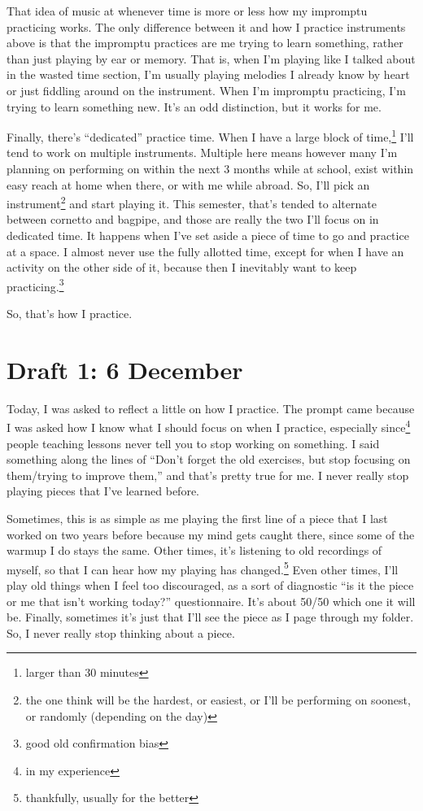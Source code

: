 \documentclass[12pt]{article}[titlepage]
\newcommand{\say}[1]{``#1''}
\newcommand{\1}{\={a}}
\newcommand{\2}{\={e}}
\newcommand{\3}{\={\i}}
\newcommand{\4}{\=o}
\newcommand{\5}{\=u}
\newcommand{\6}{\={A}}
\renewcommand{\,}{\textsuperscript{,}}
\begin{document}
That idea of music at whenever time is more or less how my impromptu practicing works.
The only difference between it and how I practice instruments above is that the impromptu practices are me trying to learn something, rather than just playing by ear or memory.
That is, when I'm playing like I talked about in the wasted time section, I'm usually playing melodies I already know by heart or just fiddling around on the instrument.
When I'm impromptu practicing, I'm trying to learn something new.
It's an odd distinction, but it works for me.

Finally, there's \say{dedicated} practice time.
When I have a large block of time,\footnote{larger than 30 minutes} I'll tend to work on multiple instruments.
Multiple here means however many I'm planning on performing on within the next 3 months while at school, exist within easy reach at home when there, or with me while abroad.
So, I'll pick an instrument\footnote{the one think will be the hardest, or easiest, or I'll be performing on soonest, or randomly (depending on the day)} and start playing it.
This semester, that's tended to alternate between cornetto and bagpipe, and those are really the two I'll focus on in dedicated time.
It happens when I've set aside a piece of time to go and practice at a space.
I almost never use the fully allotted time, except for when I have an activity on the other side of it, because then I inevitably want to keep practicing.\footnote{good old confirmation bias}

So, that's how I practice.
\section{Draft 1: 6 December}
Today, I was asked to reflect a little on how I practice.
The prompt came because I was asked how I know what I should focus on when I practice, especially since\footnote{in my experience} people teaching lessons never tell you to stop working on something.
I said something along the lines of \say{Don't forget the old exercises, but stop focusing on them/trying to improve them,} and that's pretty true for me.
I never really stop playing pieces that I've learned before.

Sometimes, this is as simple as me playing the first line of a piece that I last worked on two years before because my mind gets caught there, since some of the warmup I do stays the same.
Other times, it's listening to old recordings of myself, so that I can hear how my playing has changed.\footnote{thankfully, usually for the better}
Even other times, I'll play old things when I feel too discouraged, as a sort of diagnostic \say{is it the piece or me that isn't working today?} questionnaire.
It's about 50/50 which one it will be.
Finally, sometimes it's just that I'll see the piece as I page through my folder.
So, I never really stop thinking about a piece.
\end{document}
